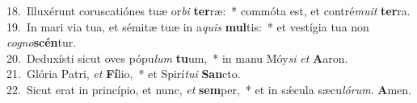 {18.~}Illuxérunt coruscatiónes tuæ or\textit{bi} \textbf{ter}ræ:~* commóta est, et contré\textit{mu}\textit{it} \textbf{ter}ra.\\
{19.~}In mari via tua, et sémitæ tuæ in a\textit{quis} \textbf{mul}tis:~* et vestígia tua non \textit{co}\textit{gno}\textbf{scén}tur.\\
{20.~}Deduxísti sicut oves pópu\textit{lum} \textbf{tu}um,~* in manu Móy\textit{si} \textit{et} \textbf{A}aron.\\
{21.~}Glória Patri, \textit{et} \textbf{Fí}lio,~* et Spirí\textit{tu}\textit{i} \textbf{San}cto.\\
{22.~}Sicut erat in princípio, et nunc, \textit{et} \textbf{sem}per,~* et in sǽcula sæcu\textit{ló}\textit{rum}. \textbf{A}men.\\
